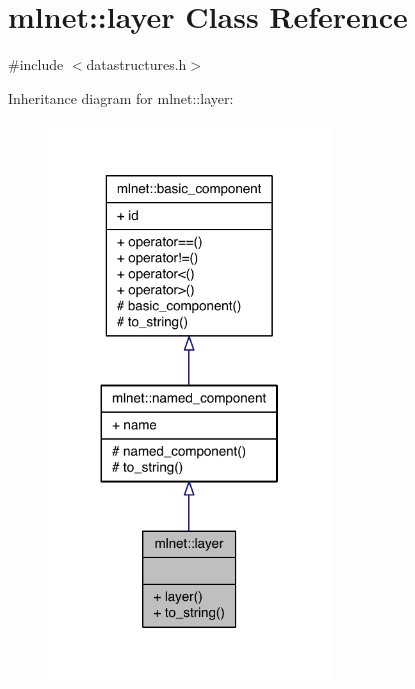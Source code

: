 \hypertarget{classmlnet_1_1layer}{\section{mlnet\+:\+:layer Class Reference}
\label{classmlnet_1_1layer}
}


{\ttfamily \#include $<$datastructures.\+h$>$}



Inheritance diagram for mlnet\+:\+:layer\+:\nopagebreak
\begin{figure}[H]
\begin{center}
\leavevmode
\includegraphics[width=212pt]{classmlnet_1_1layer__inherit__graph}
\end{center}
\end{figure}


